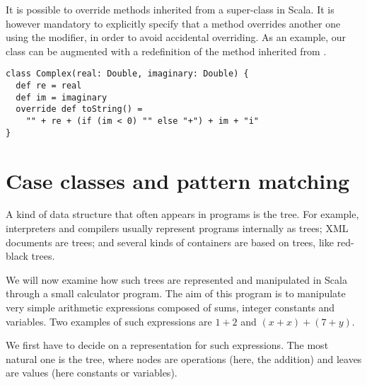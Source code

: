 \documentclass[a4paper,12pt,twoside,titlepage]{article}
\newcommand{\langname}[1]{#1\xspace}
\newcommand{\Scala}{\langname{Scala}}
\begin{document}
It is possible to override methods inherited from a super-class in
\Scala. It is however mandatory to explicitly specify that a method
overrides another one using the  modifier, in order to
avoid accidental overriding. As an example, our  class
can be augmented with a redefinition of the  method
inherited from .
\begin{lstlisting}
class Complex(real: Double, imaginary: Double) {
  def re = real
  def im = imaginary
  override def toString() =
    "" + re + (if (im < 0) "" else "+") + im + "i"
}
\end{lstlisting}

\section{Case classes and pattern matching}
\label{sec:case-classes-pattern}

A kind of data structure that often appears in programs is the tree.
For example, interpreters and compilers usually represent programs
internally as trees; XML documents are trees; and several kinds of
containers are based on trees, like red-black trees.

We will now examine how such trees are represented and manipulated in
\Scala through a small calculator program. The aim of this program is
to manipulate very simple arithmetic expressions composed of sums,
integer constants and variables. Two examples of such expressions are
$1+2$ and $(x+x)+(7+y)$.

We first have to decide on a representation for such expressions. The
most natural one is the tree, where nodes are operations (here, the
addition) and leaves are values (here constants or variables).
\end{document}
